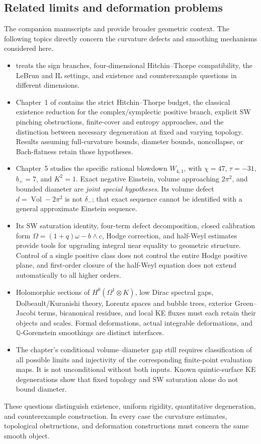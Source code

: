 \documentclass[a4paper,11pt]{article}
\numberwithin{equation}{section}
\theoremstyle{definition}
\newcommand{\Vol}{\operatorname{Vol}}
\begin{document}
\subsection{Related limits and deformation problems}\label{sec:related-tools}
The companion manuscripts  and  provide broader geometric context. The following topics directly concern the curvature defects and smoothing mechanisms considered here.
\begin{itemize}
\item {} treats the sign branches, four-dimensional Hitchin--Thorpe compatibility, the LeBrun and IL settings, and existence and counterexample questions in different dimensions.
\item Chapter~1 of  contains the strict Hitchin--Thorpe budget, the classical existence reduction for the complex/symplectic positive branch, explicit SW pinching obstructions, finite-cover and entropy approaches, and the distinction between necessary degeneration at fixed and varying topology. Results assuming full-curvature bounds, diameter bounds, noncollapse, or Bach-flatness retain those hypotheses.
\item Chapter~5 studies the specific rational blowdown $W_{4,1}$, with $\chi=47$, $\tau=-31$, $b_+=7$, and $K^2=1$. Exact negative Einstein, volume approaching $2\pi^2$, and bounded diameter are \emph{joint special hypotheses}. Its volume defect $d=\Vol-2\pi^2$ is not $\delta_-$; that exact sequence cannot be identified with a general approximate Einstein sequence.
\item Its SW saturation identity, four-term defect decomposition, closed calibration form $\Omega=(1+q)\omega-b\wedge c$, Hodge correction, and half-Weyl estimates provide tools for upgrading integral near equality to geometric structure. Control of a single positive class does not control the entire Hodge positive plane, and first-order closure of the half-Weyl equation does not extend automatically to all higher orders.
\item Holomorphic sections of $H^0(\Omega^1\otimes K)$, low Dirac spectral gaps, Dolbeault/Kuranishi theory, Lorentz spaces and bubble trees, exterior Green--Jacobi terms, bicanonical residues, and local KE fluxes must each retain their objects and scales. Formal deformations, actual integrable deformations, and $\mathbb Q$-Gorenstein smoothings are distinct interfaces.
\item The chapter's conditional volume--diameter gap still requires classification of all possible limits and injectivity of the corresponding finite-point evaluation maps. It is not unconditional without both inputs. Known quintic-surface KE degenerations show that fixed topology and SW saturation alone do not bound diameter.
\end{itemize}
These questions distinguish existence, uniform rigidity, quantitative degeneration, and counterexample construction. In every case the curvature estimates, topological obstructions, and deformation constructions must concern the same smooth object.
\end{document}
